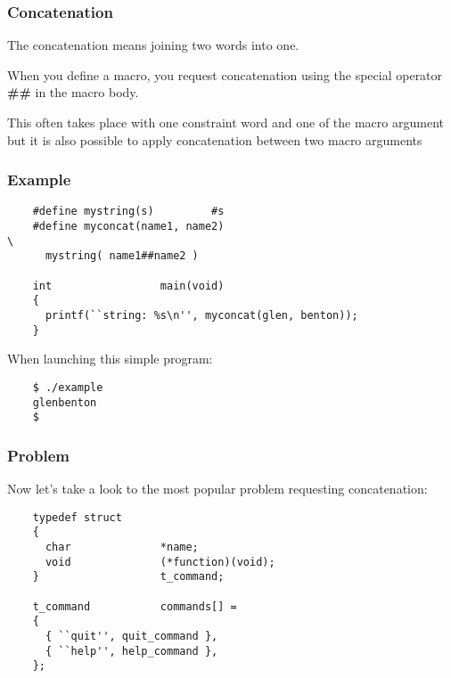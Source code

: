 \documentclass[8pt]{beamer}
\newcommand{\nl}[0]{\vspace{0.4cm}}
\begin{document}

\begin{frame}
  \frametitle{Concatenation}

  The concatenation means joining two words into one.

  \nl

  When you define a macro, you request concatenation using the special
  operator \textbf{\#\#} in the macro body.

  \nl

  This often takes place with one constraint word and one of the macro
  argument but it is also possible to apply concatenation between two
  macro arguments
\end{frame}


\begin{frame}[containsverbatim]
  \frametitle{Example}

  \begin{verbatim}
    #define mystring(s)         #s
    #define myconcat(name1, name2)                                      \
      mystring( name1##name2 )

    int                 main(void)
    {
      printf(``string: %s\n'', myconcat(glen, benton));
    }
  \end{verbatim}

  When launching this simple program:

  \begin{verbatim}
    $ ./example
    glenbenton
    $ 
  \end{verbatim}
\end{frame}


\begin{frame}[containsverbatim]
  \frametitle{Problem}

  Now let's take a look to the most popular problem requesting concatenation:

  \begin{verbatim}
    typedef struct
    {
      char              *name;
      void              (*function)(void);
    }                   t_command;

    t_command           commands[] =
    {
      { ``quit'', quit_command },
      { ``help'', help_command },
    };
  \end{verbatim}
\end{frame}

\end{document}
